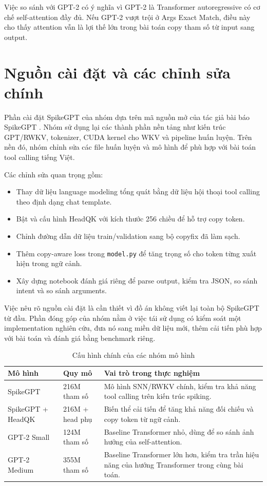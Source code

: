 \documentclass[12pt,a4paper,oneside]{report}
\newlength{\manualparindent}
\newcommand{\manualindent}{\hspace*{\manualparindent}}
\begin{document}
\manualindent%
Việc so sánh với GPT-2 có ý nghĩa vì GPT-2 là Transformer autoregressive có cơ chế self-attention đầy đủ. Nếu GPT-2 vượt trội ở Args Exact Match, điều này cho thấy attention vẫn là lợi thế lớn trong bài toán copy tham số từ input sang output.

\section{Nguồn cài đặt và các chỉnh sửa chính}

\manualindent%
Phần cài đặt SpikeGPT của nhóm dựa trên mã nguồn mở của tác giả bài báo SpikeGPT \cite{spikegpt-code}. Nhóm sử dụng lại các thành phần nền tảng như kiến trúc GPT/RWKV, tokenizer, CUDA kernel cho WKV và pipeline huấn luyện. Trên nền đó, nhóm chỉnh sửa các file huấn luyện và mô hình để phù hợp với bài toán tool calling tiếng Việt.

\manualindent%
Các chỉnh sửa quan trọng gồm:

\begin{itemize}
  \item Thay dữ liệu language modeling tổng quát bằng dữ liệu hội thoại tool calling theo định dạng chat template.
  \item Bật và cấu hình HeadQK với kích thước 256 chiều để hỗ trợ copy token.
  \item Chỉnh đường dẫn dữ liệu train/validation sang bộ copyfix đã làm sạch.
  \item Thêm copy-aware loss trong \texttt{model.py} để tăng trọng số cho token từng xuất hiện trong ngữ cảnh.
  \item Xây dựng notebook đánh giá riêng để parse output, kiểm tra JSON, so sánh intent và so sánh arguments.
\end{itemize}

\manualindent%
Việc nêu rõ nguồn cài đặt là cần thiết vì đồ án không viết lại toàn bộ SpikeGPT từ đầu. Phần đóng góp của nhóm nằm ở việc tái sử dụng có kiểm soát một implementation nghiên cứu, đưa nó sang miền dữ liệu mới, thêm cải tiến phù hợp với bài toán và đánh giá bằng benchmark riêng.

\begin{table}[H]
\centering
\caption{Cấu hình chính của các nhóm mô hình}
\small
\begin{tabularx}{\textwidth}{p{3.4cm}p{3.0cm}X}
\toprule
\textbf{Mô hình} & \textbf{Quy mô} & \textbf{Vai trò trong thực nghiệm} \\
\midrule
SpikeGPT & 216M tham số & Mô hình SNN/RWKV chính, kiểm tra khả năng tool calling trên kiến trúc spiking. \\
SpikeGPT + HeadQK & 216M + head phụ & Biến thể cải tiến để tăng khả năng đối chiếu và copy token từ ngữ cảnh. \\
GPT-2 Small & 124M tham số & Baseline Transformer nhỏ, dùng để so sánh ảnh hưởng của self-attention. \\
GPT-2 Medium & 355M tham số & Baseline Transformer lớn hơn, kiểm tra trần hiệu năng của hướng Transformer trong cùng bài toán. \\
\bottomrule
\end{tabularx}
\end{table}
\end{document}

